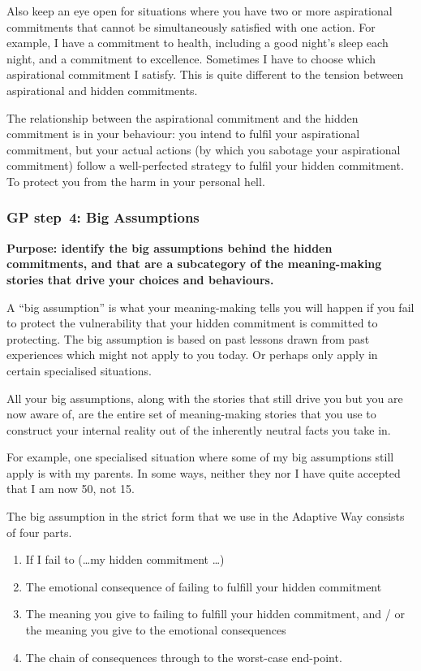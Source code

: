 Also keep an eye open for situations where you have two or more aspirational commitments that cannot be simultaneously satisfied with one action. For example, I have a commitment to health, including a good night's sleep each night, and a commitment to excellence. Sometimes I have to choose which aspirational commitment I satisfy. This is quite different to the tension between aspirational and hidden commitments.


The relationship between the aspirational commitment and the hidden commitment is in your behaviour: you intend to fulfil your aspirational commitment, but your actual actions (by which you sabotage your aspirational commitment) follow a well-perfected strategy to fulfil your hidden commitment. To protect you from the harm in your personal hell.


\subsubsection{GP step~4: Big Assumptions}
\label{chapter:big-assumptions}


\textbf{Purpose: identify the big assumptions behind the hidden commitments, and that are a subcategory of the meaning-making stories that drive your choices and behaviours.} ~


A “big assumption” is what your meaning\hyp{}making tells you will happen if you fail to protect the vulnerability that your hidden commitment is committed to protecting. The big assumption is based on past lessons drawn from past experiences which might not apply to you today. Or perhaps only apply in certain specialised situations.


All your big assumptions, along with the stories that still drive you but you are now aware of, are the entire set of meaning-making stories that you use to construct your internal reality out of the inherently neutral facts you take in.


For example, one specialised situation where some of my big assumptions still apply is with my parents. In some ways, neither they nor I have quite accepted that I am now 50, not 15. 


The big assumption in the strict form that we use in the Adaptive Way consists of four parts. 


\begin{enumerate}
\item If I fail to (\ldots my hidden commitment \ldots)
\item The emotional consequence of failing to fulfill your hidden commitment
\item The meaning you give to failing to fulfill your hidden commitment, and / or the meaning you give to the emotional consequences
\item The chain of consequences through to the worst-case end-point.
\end{enumerate}


